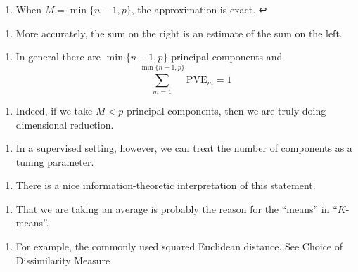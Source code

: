 \documentclass[11pt]{article}
\providecommand{\tightlist}{%
      \setlength{\itemsep}{0pt}\setlength{\parskip}{0pt}}
\begin{document}
\hypertarget{foot89}{}
\begin{enumerate}
\def\labelenumi{\arabic{enumi}.}
\setcounter{enumi}{88}
\tightlist
\item
  When \(M = \min\{n - 1, p\}\), the approximation is exact. ↩
\end{enumerate}

\hypertarget{foot90}{}
\begin{enumerate}
\def\labelenumi{\arabic{enumi}.}
\setcounter{enumi}{89}
\tightlist
\item
  More accurately, the sum on the right is an estimate of the sum on the
  left.
\end{enumerate}

\hypertarget{foot91}{}
\begin{enumerate}
\def\labelenumi{\arabic{enumi}.}
\setcounter{enumi}{90}
\tightlist
\item
  In general there are \(\min\{n-1, p\}\) principal components and
  \[\sum_{m = 1}^{\min\{n-1, p\}} \text{PVE}_m = 1\]
\end{enumerate}

\hypertarget{foot92}{}
\begin{enumerate}
\def\labelenumi{\arabic{enumi}.}
\setcounter{enumi}{91}
\tightlist
\item
  Indeed, if we take \(M < p\) principal components, then we are truly
  doing dimensional reduction.
\end{enumerate}

\hypertarget{foot93}{}
\begin{enumerate}
\def\labelenumi{\arabic{enumi}.}
\setcounter{enumi}{92}
\tightlist
\item
  In a supervised setting, however, we can treat the number of
  components as a tuning parameter.
\end{enumerate}

\hypertarget{foot94}{}
\begin{enumerate}
\def\labelenumi{\arabic{enumi}.}
\setcounter{enumi}{93}
\tightlist
\item
  There is a nice information-theoretic interpretation of this
  statement.
\end{enumerate}

\hypertarget{foot95}{}
\begin{enumerate}
\def\labelenumi{\arabic{enumi}.}
\setcounter{enumi}{94}
\tightlist
\item
  That we are taking an average is probably the reason for the ``means''
  in ``\(K\)-means''.
\end{enumerate}

\hypertarget{foot96}{}
\begin{enumerate}
\def\labelenumi{\arabic{enumi}.}
\setcounter{enumi}{95}
\tightlist
\item
  For example, the commonly used squared Euclidean distance. See Choice
  of Dissimilarity Measure 
\end{enumerate}


    
    
    
    
\end{document}
